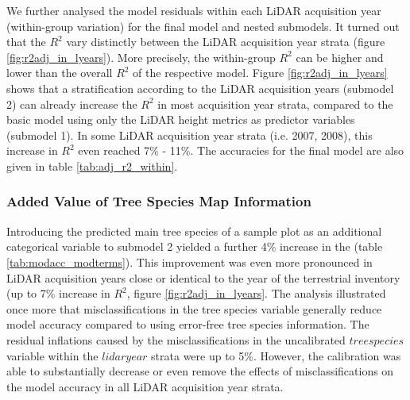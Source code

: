 

We further analysed the model residuals within each LiDAR acquisition year (within-group variation) for the final model and nested submodels. It turned out that the $R^2$ vary distinctly between the LiDAR acquisition year strata (figure \ref{fig:r2adj_in_lyears}). More precisely, the within-group $R^2$ can be higher and lower than the overall $R^2$ of the respective model. Figure \ref{fig:r2adj_in_lyears} shows that a stratification according to the LiDAR acquisition years (submodel 2) can already increase the $R^2$ in most acquisition year strata, compared to the basic model using only the LiDAR height metrics as predictor variables (submodel 1). In some LiDAR acquisition year strata (i.e. 2007, 2008), this increase in $R^2$ even reached 7\% - 11\%. The accuracies for the final model are also given in table \ref{tab:adj_r2_within}.


\subsubsection*{Added Value of Tree Species Map Information}

Introducing the predicted main tree species of a sample plot as an additional categorical variable to submodel 2 yielded a further 4\% increase in the \adjrsq{} (table \ref{tab:modacc_modterms}). This improvement was even more pronounced in LiDAR acquisition years close or identical to the year of the terrestrial inventory (up to 7\% increase in $R^2$, figure \ref{fig:r2adj_in_lyears}. The analysis illustrated once more that misclassifications in the tree species variable generally reduce model accuracy compared to using error-free tree species information. The residual inflations caused by the misclassifications in the uncalibrated $treespecies$ variable within the $lidaryear$ strata were up to 5\%. However, the calibration was able to substantially decrease or even remove the effects of misclassifications on the model accuracy in all LiDAR acquisition year strata.

























